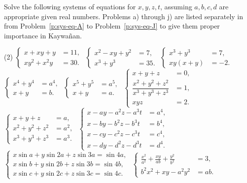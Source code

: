 \documentclass[12pt,a4paper]{memoir}
\theoremstyle{definition}
\begin{document}
	\begin{question}\label{p:sys-eq-A}
		Solve the following systems of equations for $x,y,z,t$, assuming $a,b,c,d$ are appropriate given real numbers. Problems a) through j) are listed separately in from Problem~\ref{p:sys-eq-A} to Problem~\ref{p:sys-eq-J} to give them proper importance in Kaywañan.
		\begin{tasks}(2)
			\task $\begin{cases}
				x+xy+y &= 11,\\xy^2+x^2y &= 30.
			\end{cases}$
			\task $\begin{cases}
				x^2-xy+y^2 &= 7,\\x^3+y^3 &=35.
			\end{cases}$
			\task $\begin{cases}
				x^3+y^3 &=7,\\ xy(x+y) &= -2.
			\end{cases}$
			\task $\begin{cases}
				x^4+y^4 &= a^4,\\ x+y &= b.
			\end{cases}$
			\task $\begin{cases}
				x^5+y^5 &= a^5,\\ x+y &= a.
			\end{cases}$
			\task $\begin{cases}
				x+y+z &= 0,\\ \dfrac{x^2+y^2+z^2}{x^3+y^3+z^3} &= 1,\\xyz &= 2.
			\end{cases}$
			\task $\begin{cases}
				x+y+z &=a,\\x^2+y^2+z^2 &=a^2,\\x^3+y^3+z^3 &=a^3.
			\end{cases}$
			\task $\begin{cases}
				x-ay-a^2z-a^3t &=a^4,\\x-by-b^2z-b^3t &=b^4,\\x-cy-c^2z-c^3t &=c^4,\\x-dy-d^2z-d^3t &=d^4.
			\end{cases}$
			\task $\begin{cases}
				x\sin a + y\sin 2a + z\sin 3a = \sin 4a,\\ x\sin b + y\sin 2b + z\sin 3b = \sin 4b,\\ x\sin c + y\sin 2c + z\sin 3c = \sin 4c.
			\end{cases}$
			\task $\begin{cases}
				\displaystyle \frac{x^2}{a^2}+\frac{xy}{ab}+\frac{y^2}{b^2} &=3, \\ b^2x^2+xy-a^2y^2 &=ab.
			\end{cases}$
		\end{tasks}
	\end{question}
\end{document}
